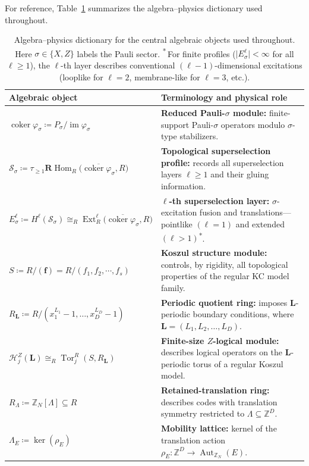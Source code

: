 \documentclass[aps,prx,english,superscriptaddress,twocolumn,tightenlines,showpacs,longbibliography,floatfix,amsfonts]{revtex4-2}
\theoremstyle{remark}
\theoremstyle{definition}
\begin{document}
For reference, Table~\ref{tab:terminology} summarizes the algebra--physics
dictionary used throughout.
\begin{table}[tbp]
	\centering
	\footnotesize
	\renewcommand{\arraystretch}{1.2}
	\setlength{\tabcolsep}{0pt}
	\begin{tabular}{@{}p{}@{\hspace{2pt}}p{}@{}}
		\toprule
		\textbf{Algebraic object} & \textbf{Terminology and physical role} \\
		\midrule
		\(\operatorname{coker}\varphi_\sigma
		\coloneqq P_\sigma/\operatorname{im}\varphi_\sigma\)
		& \textbf{Reduced Pauli-\(\sigma\) module:} finite-support
		  Pauli-\(\sigma\) operators modulo \(\sigma\)-type stabilizers. \\
		\(\mathscr S_\sigma\coloneqq
		  \tau_{\geq1}\mathbf R\!\operatorname{Hom}_R
		  \bigl(\overline{\operatorname{coker}\varphi_\sigma},R\bigr)\)
		& \textbf{Topological superselection profile:}
		  records all superselection layers \(\ell\geq1\) and their gluing information. \\
		\(E_\sigma^\ell\coloneqq H^\ell(\mathscr S_\sigma)
		\cong_R\operatorname{Ext}_R^\ell
		\bigl(\overline{\operatorname{coker}\varphi_\sigma},R\bigr)\)
		& \textbf{\(\ell\)-th superselection layer:} \(\sigma\)-excitation fusion and
		  translations---pointlike \((\ell=1)\) and extended
		  \((\ell>1)\)\textsuperscript{*}. \\
		\(S\coloneqq R/(\mathbf f) = R/(f_1,f_2,\cdots,f_s)\)
		& \textbf{Koszul structure module:} controls, by rigidity, all topological
		  properties of the regular KC model family. \\
		\(R_{\mathbf L}\coloneqq
		R/(x_1^{L_1}-1,\ldots,x_D^{L_D}-1)\)
		& \textbf{Periodic quotient ring:} imposes \(\mathbf L\)-periodic
		  boundary conditions, where \(\mathbf L=(L_1,L_2,\ldots,L_D)\). \\
		\(\mathcal H_j^Z(\mathbf L)
		  \cong_R\operatorname{Tor}_j^R(S,R_{\mathbf L})\)
		& \textbf{Finite-size \(Z\)-logical module:} describes logical
		  operators on the \(\mathbf L\)-periodic torus of a regular Koszul model. \\
		\(R_\Lambda\coloneqq\mathbb Z_N[\Lambda]\subseteq R\)
		& \textbf{Retained-translation ring:} describes codes with translation
		  symmetry restricted to \(\Lambda\subseteq\mathbb Z^D\). \\
		\(\Lambda_E \coloneqq \ker(\rho_E)\)
		& \textbf{Mobility lattice:} kernel of the translation action
		  \(\rho_E:\mathbb Z^D\to\operatorname{Aut}_{\mathbb Z_N}(E)\). \\
		\bottomrule
	\end{tabular}
	\caption{Algebra--physics dictionary for the central algebraic
		objects used throughout. Here \(\sigma\in\{X,Z\}\) labels the Pauli sector.
		\textsuperscript{*}\,For finite profiles
		(\(\lvert E_\sigma^\ell\rvert<\infty\) for all \(\ell\geq1\)), the
		\(\ell\)-th layer describes conventional \((\ell-1)\)-dimensional
		excitations (looplike for \(\ell=2\), membrane-like for \(\ell=3\), etc.).}
	\label{tab:terminology}
\end{table}
\end{document}
